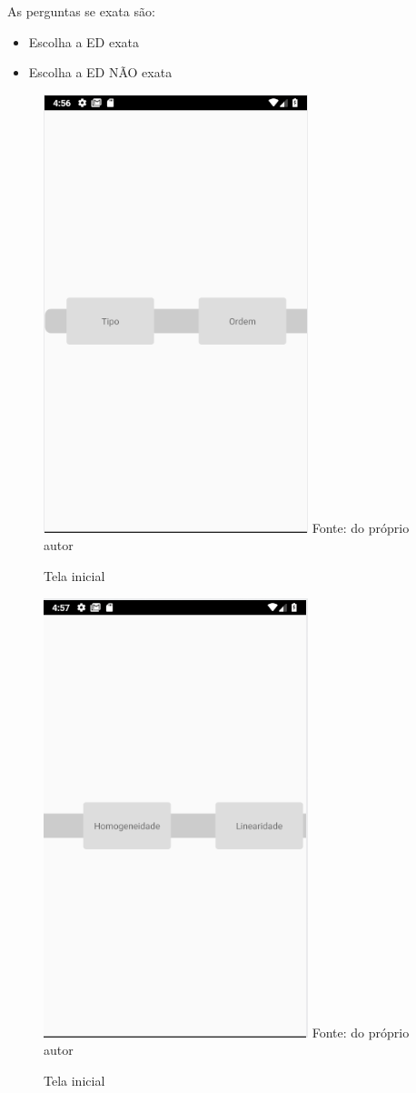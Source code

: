 As perguntas se exata são:
\begin{itemize}
	\item{}Escolha a ED exata
	\item{}Escolha a ED NÃO exata
\end{itemize} 

\begin{figure}[H]
\centering
\caption{Tela inicial}
\includegraphics[scale=0.72]{figuras/modo_classificacao_1.png}
\small{Fonte: do próprio autor}
\end{figure}

\begin{figure}[H]
\centering
\caption{Tela inicial}
\includegraphics[scale=0.72]{figuras/modo_classificacao_2.png}
\small{Fonte: do próprio autor}
\end{figure}


